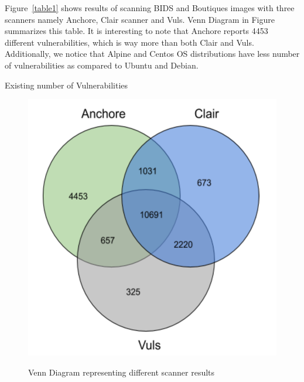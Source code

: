 \documentclass[a4paper,num-refs]{oup-contemporary}
\begin{document}
Figure~\ref{table1} shows results of scanning BIDS and Boutiques images with three scanners namely Anchore,
Clair scanner and Vuls. Venn Diagram in Figure~\cite{fig:venn} summarizes this table. It is interesting to note that
Anchore reports 4453 different vulnerabilities, which is way more than both Clair and Vuls.
Additionally, we notice that Alpine and Centos OS distributions have less number of vulnerabilities as
compared to Ubuntu and Debian.
\begin{table}
%
       \centering
	\caption{\label{table1}Existing number of Vulnerabilities}
\end{table}

\begin{figure}[!htb]
        {\includegraphics[scale=2.5,width=\columnwidth]
        {Figures/vennDiagram.png}}
        \caption{\label{fig:venn} Venn Diagram representing different scanner results}
\end{figure}
\end{document}
